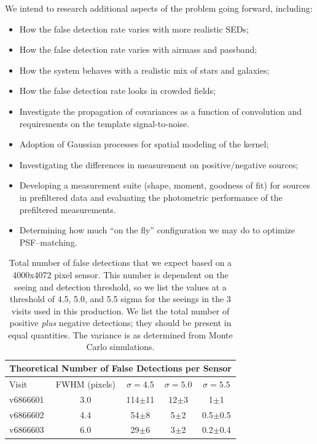 \documentclass[prd, nofootinbib, floatfix, 11pt,tightenlines,times]{article}
\begin{document}
We intend to research additional aspects of the problem going forward,
including:
\begin{itemize}
\item How the false detection rate varies with more realistic SEDs;
\item How the false detection rate varies with airmass and passband;
\item How the system behaves with a realistic mix of stars and galaxies;
\item How the false detection rate looks in crowded fields;
\item Investigate the propagation of covariances as a function of
  convolution and requirements on the template signal-to-noise.
\item Adoption of Gaussian processes for spatial modeling of the kernel;
\item Investigating the differences in measurement on positive/negative sources;
\item Developing a measurement suite (shape, moment, goodness of fit)
  for sources in prefiltered data and evaluating the photometric
  performance of the prefiltered measurements.
\item Determining how much ``on the fly'' configuration we may do to optimize PSF--matching.
\end{itemize}

\clearpage



\clearpage

\begin{table}
\centering
\begin{tabular}{lcccc}
\hline
\multicolumn{5}{|c|}{Theoretical Number of False Detections per Sensor} \\
\hline
Visit    & FWHM (pixels) & $\sigma=4.5$ & $\sigma=5.0$ & $\sigma=5.5$\\
\hline
v6866601 & 3.0 & 114$\pm$11 & 12$\pm$3& 1$\pm$1\\
v6866602 & 4.4 & 54$\pm$8 & 5$\pm$2& 0.5$\pm$0.5\\
v6866603 & 6.0 & 29$\pm$6 & 3$\pm$2&0.2$\pm$0.4\\
\end{tabular}
\caption{Total number of false detections that we expect based on a
  4000x4072 pixel sensor.  This number is dependent on the seeing and
  detection threshold, so we list the values at a threshold of 4.5,
  5.0, and 5.5 sigma for the seeings in the 3 visits used in this
  production. We list the total number of positive {\it plus} negative
  detections; they should be present in equal quantities. The variance
  is as determined from Monte Carlo simulations.\label{tab-fp} }
\end{table}
\end{document}
